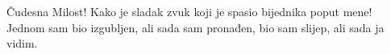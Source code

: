 Čudesna Milost!
Kako je sladak zvuk
koji je spasio bijednika poput mene!
Jednom sam bio izgubljen,
ali sada sam pronađen,
bio sam slijep, ali sada ja vidim. 
